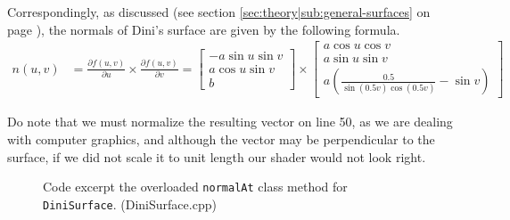 \documentclass[11pt]{article}
\newcommand{\secref}[1]{see section \ref{#1} on page \pageref{#1}}
\newcommand{\code}[1]{{\tt #1}}
\newcommand{\codefig}[5]
{
\begin{figure}[H]
    
    \caption{Code excerpt #5 (#2)}
    \label{code:#1}
\end{figure}
}
\begin{document}
Correspondingly, as discussed (\secref{sec:theory|sub:general-surfaces}), the
normals of Dini's surface are given by the following formula.
\begin{align}
    n(u,v)
    &= \frac{\partial f(u,v)}{\partial u}
       \times
       \frac{\partial f(u,v)}{\partial v}
    =
    \begin{bmatrix}
        -a \sin u \sin v \\
         a \cos u \sin v \\
         b
    \end{bmatrix}
    \times
    \begin{bmatrix}
        a \cos u \cos v \\
        a \sin u \sin v \\
        a (\frac{0.5}{\sin(0.5 v) \cos(0.5 v)} - \sin v)
    \end{bmatrix}
\end{align}

Do note that we must normalize the resulting vector on line 50, as we are
dealing with computer graphics, and although the vector may be perpendicular
to the surface, if we did not scale it to unit length our shader would not
look right.
\codefig{dini-surface-nml}{DiniSurface.cpp}{40}{50}
{the overloaded \code{normalAt} class method for \code{DiniSurface}.}
\end{document}

